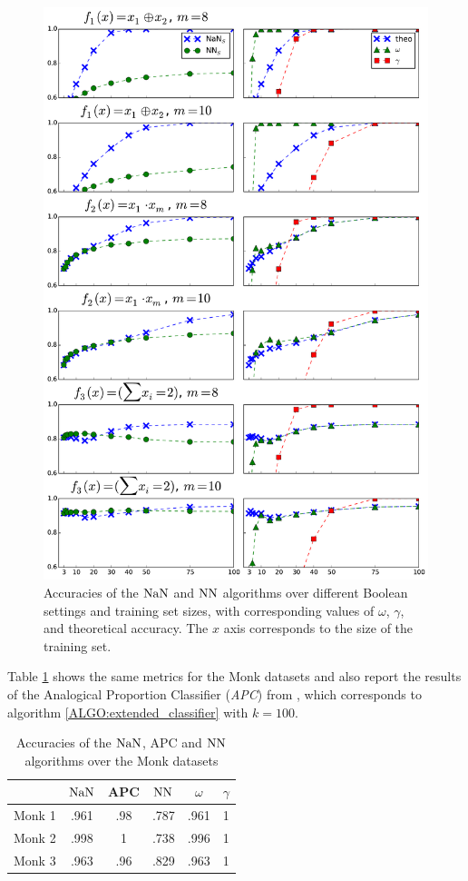 \begin{figure}[h!]
\caption{Accuracies of the $\mbox{NaN}$ and $\mbox{NN}$ algorithms  over different Boolean
  settings and training set sizes, with corresponding values of $\omega$,
  $\gamma$, and theoretical accuracy. The $x$ axis corresponds to the size of
the training set.}
\label{plots}
\includegraphics[width=\linewidth ]{figures/ecai_plots.pdf}
\end{figure}

Table \ref{TABLE_MONK} shows the same metrics for the Monk datasets and
also report the results of the Analogical Proportion Classifier (\textit{APC})
from \cite{MicBayDelJAIR08}, which corresponds to algorithm
\ref{ALGO:extended_classifier} with $k=100$.

\begin{table}
\centering
\caption{Accuracies of the $\mbox{NaN}$, APC and $\mbox{NN}$ algorithms over the Monk datasets}
\label{TABLE_MONK}
\begin{tabular}{| c | c | c | c | c | c |}
\toprule
& $\mbox{NaN}$  & APC & $\mbox{NN}$  &  $\omega$ & $\gamma$ \\
\midrule
Monk 1 & .961 & .98 & .787 &   .961    &   1 \\
Monk 2 & .998 & 1 & .738 &    .996    &   1 \\
Monk 3 & .963 & .96 & .829 &   .963    &   1 \\
\bottomrule
\end{tabular}
\end{table}


